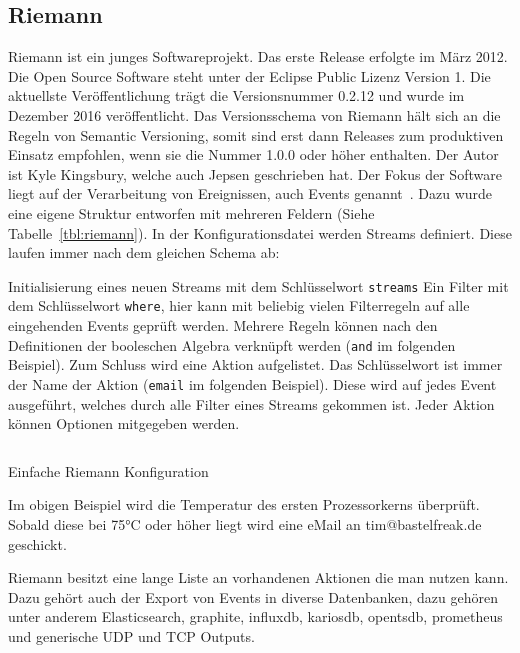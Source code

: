 \subsection{Riemann}
Riemann ist ein junges Softwareprojekt. Das erste Release erfolgte im März
2012. Die Open Source Software steht unter der Eclipse Public Lizenz Version 1.
Die aktuellste Veröffentlichung trägt die Versionsnummer 0.2.12 und wurde im
Dezember 2016 veröffentlicht. Das Versionsschema von Riemann hält sich an die
Regeln von \gls{Semantic Versioning}, somit sind erst dann Releases zum
produktiven Einsatz empfohlen, wenn sie die Nummer 1.0.0 oder höher enthalten.
Der Autor ist Kyle Kingsbury, welche auch \gls{Jepsen} geschrieben hat. Der
Fokus der Software liegt auf der Verarbeitung von Ereignissen, auch Events
genannt~\cite{riemann_concepts}. Dazu wurde eine eigene Struktur entworfen mit
mehreren Feldern (Siehe Tabelle~\ref{tbl:riemann}). In der Konfigurationsdatei
werden Streams definiert. Diese laufen immer nach dem gleichen Schema ab:

\begin{outline}
  \lstset{language=Clojure}
  \1 Initialisierung eines neuen Streams mit dem Schlüsselwort
  \lstinline|streams|
  \1 Ein Filter mit dem Schlüsselwort \lstinline|where|, hier kann mit beliebig
  vielen Filterregeln auf alle eingehenden Events geprüft werden. Mehrere
  Regeln können nach den Definitionen der booleschen Algebra verknüpft werden
  (\lstinline|and| im folgenden Beispiel).
  \1 Zum Schluss wird eine Aktion aufgelistet. Das Schlüsselwort ist immer der
  Name der Aktion (\lstinline|email| im folgenden Beispiel). Diese wird auf
  jedes Event ausgeführt, welches durch alle Filter eines Streams gekommen ist.
  Jeder Aktion können Optionen mitgegeben werden.
\end{outline}

\begin{listing}
  \inputminted{clojure}{../listings/riemann-config.txt}
  \caption{Einfache Riemann Konfiguration}
\end{listing}

Im obigen Beispiel wird die Temperatur des ersten Prozessorkerns überprüft.
Sobald diese bei 75°C oder höher liegt wird eine eMail an tim@bastelfreak.de
geschickt.

Riemann besitzt eine lange Liste an vorhandenen Aktionen die man nutzen kann.
Dazu gehört auch der Export von Events in diverse Datenbanken, dazu gehören
unter anderem Elasticsearch, graphite, influxdb, kariosdb, opentsdb, prometheus
und generische UDP und TCP Outputs.

